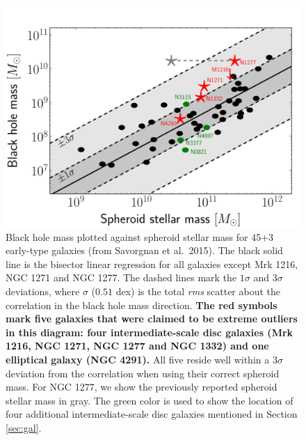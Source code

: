 \documentclass[useAMS,usenatbib,article]{mn2e}
\begin{document}
\begin{figure}
\begin{center}
\includegraphics[width=\columnwidth]{images/mm.pdf}
\caption{Black hole mass plotted against spheroid stellar mass for 45+3 early-type galaxies (from Savorgnan et al.~2015). 
The black solid line is the bisector linear regression for all galaxies except Mrk 1216, NGC 1271 and NGC 1277. 
The dashed lines mark the $1\sigma$ and $3\sigma$ deviations, 
where $\sigma$ ($0.51$ dex) is the total \emph{rms} scatter about the correlation in the black hole mass direction. 
{\bf The red symbols mark five galaxies that were claimed to be extreme outliers in this diagram: 
four intermediate-scale disc galaxies (Mrk 1216, NGC 1271, NGC 1277 and NGC 1332) and one elliptical galaxy (NGC 4291). }
All five reside well within a $3\sigma$ deviation from the correlation when using their correct spheroid mass. 
For NGC 1277, we show the previously reported spheroid stellar mass \citep{vandenbosch2012} in gray. 
The green color is used to show the location of four additional intermediate-scale disc galaxies mentioned in Section \ref{sec:gal}.}
\label{fig:mm}
\end{center}
\end{figure}
\end{document}
